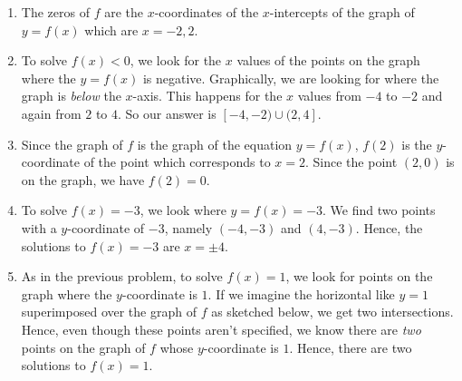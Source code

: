 \documentclass{ximera}
\begin{document}
\begin{example}
\begin{explanation}
\begin{enumerate}
\item  The zeros of $f$ are the $x$-coordinates of the $x$-intercepts of the graph of $y=f(x)$ which are $x=-2, 2$.

\item  To solve $f(x) < 0$, we look for the $x$ values of the points on the graph where the $y = f(x)$ is negative.   Graphically, we are looking for where the graph is \textit{below}  the $x$-axis.  This happens for the $x$ values from $-4$ to $-2$ and again from $2$ to $4$.  So our answer is $[-4,-2) \cup (2,4]$.

\item  Since the graph of $f$ is the graph of the equation $y=f(x)$, $f(2)$ is the $y$-coordinate of the point which corresponds to $x = 2$.  Since the point $(2,0)$ is on the graph, we have $f(2) = 0$.

\item  To solve $f(x) = -3$, we look where $y = f(x) = -3$.  We find two points with a $y$-coordinate of $-3$, namely $(-4,-3)$ and $(4,-3)$.  Hence, the solutions to $f(x) = -3$ are $x = \pm 4$.

\item As in the previous problem, to solve $f(x)=1$, we look for points on the graph where the $y$-coordinate is $1$.  If we imagine the horizontal like $y=1$ superimposed over the graph of $f$ as sketched below, we get two intersections.  Hence, even though these points aren't specified, we know there are \textit{two} points on the graph of $f$ whose $y$-coordinate is $1$.  Hence, there are two solutions to $f(x) = 1$.

\begin{image}
% 
\end{image}



\end{enumerate}
\end{explanation}
\end{example}
\end{document}
